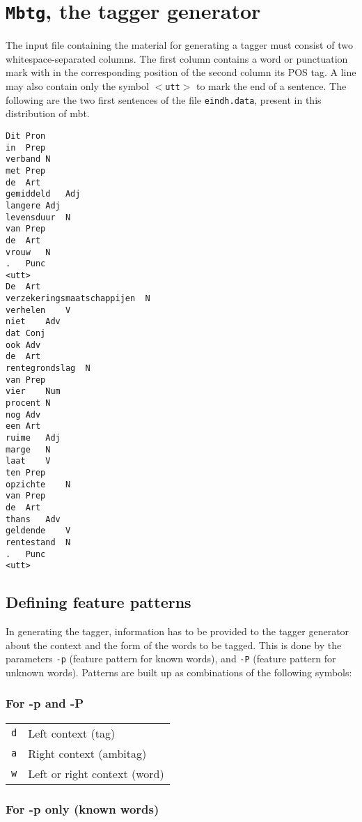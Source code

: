 \documentclass{report}
\begin{document}
\section{{\tt Mbtg}, the tagger generator}

The input file containing the material for generating a tagger must
consist of two whitespace-separated columns. The first column contains
a word or punctuation mark with in the corresponding position of the
second column its POS tag. A line may also contain only the symbol
{\tt $<$utt$>$} to mark the end of a sentence. The following are the two first
sentences of the file {\tt eindh.data}, present in this distribution
of {\sc mbt}.

{\footnotesize
\begin{verbatim}
Dit	Pron
in	Prep
verband	N
met	Prep
de	Art
gemiddeld	Adj
langere	Adj
levensduur	N
van	Prep
de	Art
vrouw	N
.	Punc
<utt>
De	Art
verzekeringsmaatschappijen	N
verhelen	V
niet	Adv
dat	Conj
ook	Adv
de	Art
rentegrondslag	N
van	Prep
vier	Num
procent	N
nog	Adv
een	Art
ruime	Adj
marge	N
laat	V
ten	Prep
opzichte	N
van	Prep
de	Art
thans	Adv
geldende	V
rentestand	N
.	Punc
<utt>
\end{verbatim}
}


\subsection{Defining feature patterns}

In generating the tagger, information has to be provided to the
tagger generator about the context and the form of the words to be
tagged. This is done by the parameters {\tt -p} (feature pattern for known
words), and {\tt -P} (feature pattern for unknown words). Patterns are
built up as combinations of the following symbols:

\subsubsection*{For -p and -P}

\begin{tabular}{ll}
{\tt d} & Left context (tag)\\
{\tt a} & Right context (ambitag)\\
{\tt w} & Left or right context (word)\\
\end{tabular}

\subsubsection*{For -p only (known words)}
\end{document}
